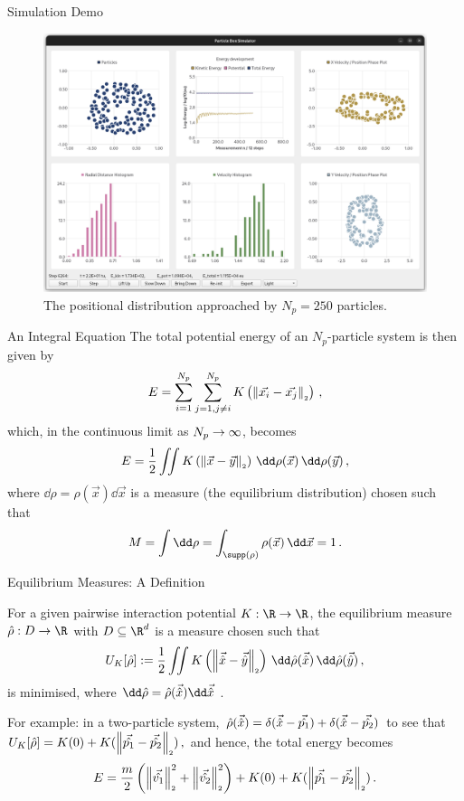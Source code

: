\documentclass[aspectratio=169, hyperref={colorlinks=true}]{beamer}
\begin{document}
  \begin{frame}{Simulation Demo}
    \begin{figure}
      \centering
      \includegraphics[width=0.64\linewidth]{gui-screenshot.png}
      \caption*{The positional distribution approached by $N_p = 250$ particles.}
    \end{figure}
  \end{frame}

  \begin{frame}{An Integral Equation}
    \vspace{0.4cm}
    The total potential energy of an $N_p$-particle system is then given by
    $$E = \sum_{i=1}^{N_p} \sum_{j=1, j \neq i}^{N_p} K\left(\left\lVert\vec{x_i} - \vec{x_j}\right\rVert_{\scriptscriptstyle 2}\right)\,,$$
    which, in the continuous limit as $N_p \rightarrow \infty$, becomes
    $$E = \frac{1}{2} \iint K\left(\norm{\vec{x} - \vec{y}}\right) \,\dd\rho(\vec{x})\,\dd\rho(\vec{y})\,,$$
    where $\dd\rho = \rho(\vec{x})\dd\vec{x}$ is a measure (the equilibrium distribution) chosen such that
    $$M = \int \dd\rho = \int_{\supp(\rho)} \rho(\vec{x}) \,\dd\vec{x} = 1\,.$$
  \end{frame}

  \begin{frame}{Equilibrium Measures: A Definition}
    \begin{definition}
      For a given pairwise interaction potential $K: \R \to \R$, the equilibrium measure $\hat{\rho}: D \to \R$ with $D \subseteq \R^d$ is a measure chosen such that
      $$U_K[\hat{\rho}] := \frac{1}{2} \iint K\left(\norm{\hatvec{x} - \hatvec{y}}\right) \,\dd\hat{\rho}(\hatvec{x})\,\dd\hat{\rho}(\hatvec{y})\,,$$
      is minimised, where $\dd\hat{\rho} = \hat{\rho}(\hatvec{x})\dd\hatvec{x}$ \parencite{2021-arbitrary-dimensions}.
    \end{definition}
    \pause

    For example: in a two-particle system, $\hat{\rho}(\vec{\hat{x}}) = \delta(\vec{\hat{x}}-\vec{\hat{p_1}}) + \delta(\vec{\hat{x}}-\vec{\hat{p_2}})$ to see that
    $U_K[\hat{\rho}] = K(0) + K(\left\lVert\vec{\hat{p_1}} - \vec{\hat{p_2}}\right\rVert_{\scriptscriptstyle 2})\,,$
    and hence, the total energy becomes
    $$E = \frac{m}{2} \left(\left\lVert\vec{\hat{v_1}}\right\rVert_{\scriptscriptstyle 2}^2 + \left\lVert\vec{\hat{v_2}}\right\rVert_{\scriptscriptstyle 2}^2\right) + K(0) + K(\left\lVert\vec{\hat{p_1}} - \vec{\hat{p_2}}\right\rVert_{\scriptscriptstyle 2})\,.$$
  \end{frame}
\end{document}
